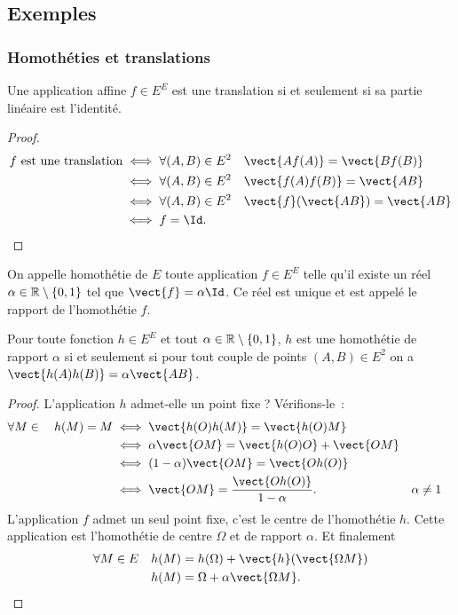 \subsection{Exemples}

\subsubsection{Homothéties et translations}

\begin{prop}
  Une application affine $f \in E^E$ est une translation si et seulement si sa partie linéaire est l'identité.
\end{prop}
\begin{proof}
  \begin{align}
    f \text{~est une translation} &\iff \forall (A,B) \in E^2 \quad \vect{Af(A)} = \vect{Bf(B)} \\
    &\iff \forall (A,B) \in E^2 \quad \vect{f(A)f(B)} = \vect{AB} \\
    &\iff \forall (A,B) \in E^2 \quad \vect{f}(\vect{AB}) = \vect{AB} \\
    &\iff f=\Id.
  \end{align}
\end{proof}

\begin{defdef}
  On appelle homothétie de $E$ toute application $f \in E^E$ telle qu'il existe un réel $\alpha \in \mathbb{R}\setminus\{0, 1\}$ tel que $\vect{f}=\alpha \Id$. Ce réel est unique et est appelé le rapport de l'homothétie $f$.
\end{defdef}
\begin{prop}
  Pour toute fonction $h \in E^E$ et tout $\alpha \in \mathbb{R}\setminus\{0, 1\}$, $h$ est une homothétie de rapport $\alpha$ si et seulement si pour tout couple de points $(A, B) \in E^2$ on a $\vect{h(A)h(B)}=\alpha \vect{AB}$.
\end{prop}
\begin{proof}
  L'application $h$ admet-elle un point fixe ? Vérifions-le~:
  \begin{align}
    \forall M \in \quad h(M) = M &\iff \vect{h(O)h(M)} = \vect{h(O)M} \\
    &\iff \alpha \vect{OM} =\vect{h(O)O} +\vect{OM} \\
    &\iff (1-\alpha) \vect{OM} = \vect{Oh(O)} \\
    &\iff \vect{OM} = \frac{\vect{Oh(O)}}{1-\alpha}. && \alpha \neq 1
  \end{align}
  L'application $f$ admet un seul point fixe, c'est le centre de l'homothétie $h$. Cette application est l'homothétie de centre $\Omega$ et de rapport $\alpha$. Et finalement
  \begin{align}
    \forall M \in E \quad h(M) &= h(\Omega)+\vect{h}(\vect{\Omega M}) \\
    h(M) &=  \Omega +\alpha \vect{\Omega M}.
  \end{align}
\end{proof}

